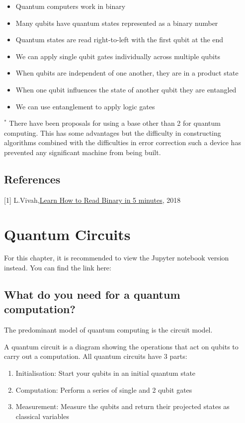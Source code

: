 \documentclass{book}
\begin{document}
\begin{itemize}
    \item Quantum computers work in binary
    \item Many qubits have quantum states represented as a binary number
    \item Quantum states are read right-to-left with the first qubit at the end
    \item We can apply single qubit gates individually across multiple qubits 
    \item When qubits are independent of one another, they are in a product state
    \item When one qubit influences the state of another qubit they are entangled 
    \item We can use entanglement to apply logic gates
\end{itemize}


$^*$ There have been proposals for using a base other than 2 for quantum computing. This has some advantages but the difficulty in constructing algorithms combined with the difficulties in error correction such a device has prevented any significant machine from being built.
\section{References}

[1] L.Vivah,\href{https://medium.com/@LindaVivah/learn-how-to-read-binary-in-5-minutes-dac1feb991e}{Learn How to Read Binary in 5 minutes}, 2018
\chapter{Quantum Circuits}

For this chapter, it is recommended to view the Jupyter notebook version instead. You can find the link here: 

\section{What do you need for a quantum computation?}

The predominant model of quantum computing is the circuit model. 

A quantum circuit is a diagram showing the operations that act on qubits to carry out a computation. All quantum circuits have 3 parts:

\begin{enumerate}
    \item Initialisation: Start your qubits in an initial quantum state
    \item Computation: Perform a series of single and 2 qubit gates
    \item Measurement: Measure the qubits and return their projected states as classical variables
\end{enumerate}
\end{document}
